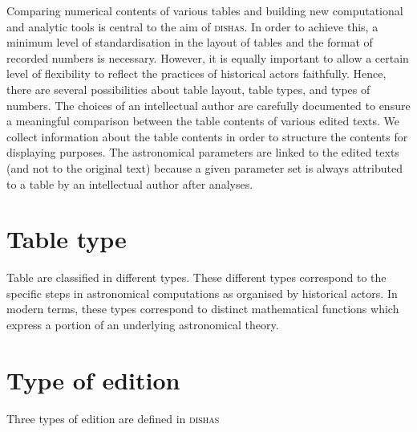 \documentclass[a4paper,12pt,twoside]{book}
\begin{document}
	Comparing numerical contents of various tables and building new computational and analytic tools is central to the aim of \textsc{dishas}. In order to achieve this, a minimum level of standardisation in the layout of tables and the format of recorded numbers is necessary. However, it is equally important to allow a certain level of flexibility to reflect the practices of historical actors faithfully. Hence, there are several possibilities about table layout, table types, and types of numbers. The choices of an intellectual author are carefully documented to ensure a meaningful comparison between the table contents of various edited texts.
	We collect information about the table contents in order to structure the contents for displaying purposes. The astronomical parameters are linked to the edited texts (and not to the original text) because a given parameter set is always attributed to a table by an intellectual author after analyses.
	
		\section{Table type}
	Table are classified in different types. These different types correspond to the specific steps in astronomical computations as organised by historical actors. In modern terms, these types correspond to distinct mathematical functions which express a portion of an underlying astronomical theory.
	
		\section{Type of edition}
	Three types of edition are defined in \textsc{dishas}
	
\end{document}
